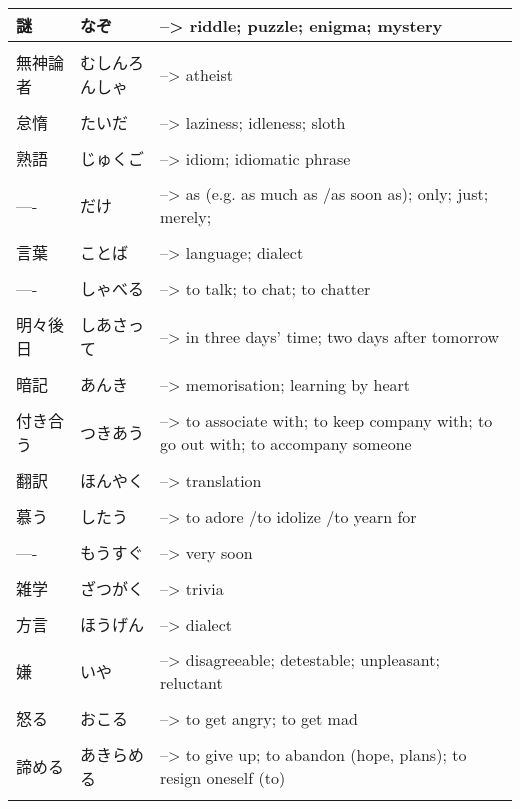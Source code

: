 \documentclass{article}
\begin{document}
\begin{tabular}{ l | l p{14cm}  }
謎 &なぞ &--> riddle; puzzle; enigma; mystery \\ \hline\\[-1em]
無神論者 &むしんろんしゃ &--> atheist \\ \hline\\[-1em]
怠惰 &たいだ &--> laziness; idleness; sloth \\ \hline\\[-1em]
熟語 &じゅくご &--> idiom; idiomatic phrase \\ \hline\\[-1em]
---- &だけ &--> as (e.g. as much as /as soon as); only; just; merely; \\ \hline\\[-1em]
言葉 &ことば &--> language; dialect \\ \hline\\[-1em]
---- &しゃべる &--> to talk; to chat; to chatter \\ \hline\\[-1em]
明々後日 & しあさって &--> in three days' time; two days after tomorrow \\ \hline\\[-1em]
暗記 & あんき &--> memorisation; learning by heart \\ \hline\\[-1em]
付き合う & つきあう &--> to associate with; to keep company with; to go out with; to accompany someone \\ \hline\\[-1em]
翻訳 & ほんやく &--> translation \\ \hline\\[-1em]
慕う & したう &--> to adore /to idolize /to yearn for\\ \hline\\[-1em]
---- & もうすぐ &--> very soon \\ \hline\\[-1em]
雑学 & ざつがく &--> trivia \\ \hline\\[-1em]
方言 & ほうげん &--> dialect \\ \hline\\[-1em]
嫌 & いや &--> disagreeable; detestable; unpleasant; reluctant \\ \hline\\[-1em]
怒る & おこる &--> to get angry; to get mad \\ \hline\\[-1em]
諦める & あきらめる &--> to give up; to abandon (hope, plans); to resign oneself (to) \\ \hline\\[-1em]

\end{tabular}
\end{document}
